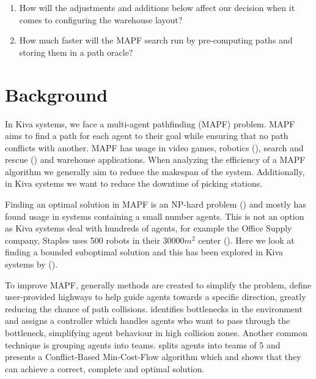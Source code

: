 \documentclass[a4paper,11pt]{article}
\begin{document}
\begin{enumerate}
	\item How will the adjustments and additions below affect our decision when it comes to configuring the warehouse layout?

\item How much faster will the MAPF search run by pre-computing paths and storing them in a path oracle?
\end{enumerate}

\section{Background}
\label{background}

In Kiva systems, we face a multi-agent pathfinding (MAPF) problem. MAPF aims to find a path for each agent to their goal while ensuring that no path conflicts with another. MAPF has usage in video games, robotics (\cite{bennewitz2002finding}), search and rescue (\cite{konolige2006centibots}) and warehouse applications. When analyzing the efficiency of a MAPF algorithm we generally aim to reduce the makespan of the system. Additionally, in Kiva systems we want to reduce the downtime of picking stations.

Finding an optimal solution in MAPF is an NP-hard problem (\cite{yu2013structure}) and mostly has found usage in systems containing a small number agents. This is not an option as Kiva systems deal with hundreds of agents, for example the Office Supply company, Staples uses 500 robots in their $30000m^{2}$ center (\cite{guizzo2008three}). Here we look at finding a bounded suboptimal solution and this has been explored in Kiva systems by (\cite{cohen2016bounded}).

To improve MAPF, generally methods are created to simplify the problem, \cite{cohen2016bounded} define user-provided highways to help guide agents towards a specific direction, greatly reducing the chance of path collisions. \cite{wilt2014spatially} identifies bottlenecks in the environment and assigns a controller which handles agents who want to pass through the bottleneck, simplifying agent behaviour in high collision zones. Another common technique is grouping agents into teams. \cite{ma2016optimal} splits agents into teams of 5 and presents a Conflict-Based Min-Cost-Flow algorithm which and shows that they can achieve a correct, complete and optimal solution.
\end{document}
